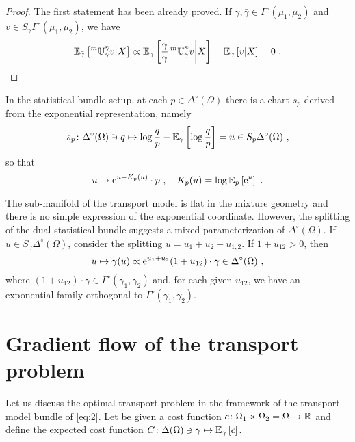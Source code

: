 \documentclass[runningheads]{llncs}
\begin{document}
\begin{proof}
The first statement has been already proved. If $\gamma,\bar\gamma \in \Gamma^\circ (\mu_1,\mu_2)$ and $v \in S_{\gamma}\Gamma^\circ(\mu_1,\mu_2)$, we have
\begin{equation*}
  {\operatorname{\mathbb E}}_{\bar\gamma}\left[\prescript{m}{}{\mathbb U}_{\gamma}^{\bar\gamma} v \middle| X\right] \propto {\operatorname{\mathbb E}}_{\gamma}\left[\frac {\bar\gamma}{\gamma} \prescript{m}{}{\mathbb U}_{\gamma}^{\bar\gamma} v \middle| X\right] = {\operatorname{\mathbb E}}_{\gamma}\left[v \middle| X\right] = 0 \ . 
\end{equation*}
\end{proof}
\begin{remark}
  In the statistical bundle setup, at each $p \in \Delta^\circ(\Omega)$ there is a chart $s_p$ derived from the exponential representation, namely
\begin{equation*}
 s_p \colon \Delta^\circ(\Omega) \ni q \mapsto \log \frac q p - {\operatorname{\mathbb E}}_{\gamma}\left[\log \frac q p\right] = u \in S_p\Delta^\circ(\Omega) \ ,
\end{equation*}
so that
\begin{equation*}
  u \mapsto \mathrm{e}^{u - K_p(u)} \cdot p \ , \quad K_p(u) = \log {\operatorname{\mathbb E}}_{p}\left[\mathrm{e}^u\right] \ .
\end{equation*}

The sub-manifold of the transport model is flat in the mixture geometry and there is no simple expression of the exponential coordinate. However, the splitting of the dual statistical bundle suggests a mixed parameterization of $\Delta^\circ(\Omega)$. If $u \in S_\gamma \Delta^\circ(\Omega)$, consider the splitting $u = u_1+u_2+u_{1,2}$.
If $1 + u_{12} > 0$, then
\begin{equation*}
  u \mapsto \gamma(u) \propto \euler^{u_1+u_2} (1+u_{12})\cdot \gamma \in \Delta^\circ(\Omega)\ ,
\end{equation*}
where $(1+u_{12}) \cdot \gamma \in \Gamma^\circ(\gamma_1,\gamma_2)$ and, for each given $u_{12}$, we have an exponential family orthogonal to $\Gamma^\circ(\gamma_1,\gamma_2)$.
\end{remark}

\section{Gradient flow of the transport problem}
\label{sec:gradientflow}
Let us discuss the optimal transport problem in the framework of the transport model bundle of \cref{eq:2}. Let be given a cost function $c \colon \Omega_1 \times \Omega_2 = \Omega \to \mathbb R$ and define the expected cost function $C \colon \Delta(\Omega)\ni \gamma \mapsto {\operatorname{\mathbb E}}_{\gamma}\left[c\right]$.
\end{document}

